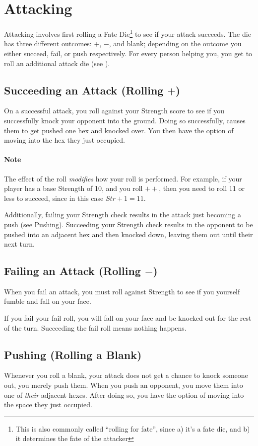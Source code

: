 \section{Attacking} \label{attacking}
Attacking involves first rolling a Fate Die\footnote{This is also commonly called ``rolling for fate'', since a) it's a fate die, and b) it determines the fate of the attacker} to see if your attack succeeds.
The die has three different outcomes: $+$, $-$, and blank; depending on the outcome you either succeed, fail, or push respectively.
For every person helping you, you get to roll an additional attack die (see ).

\subsection{Succeeding an Attack (Rolling $+$)}
On a successful attack, you roll against your Strength score to see if you successfully knock your opponent into the ground.
Doing so successfully, causes them to get pushed one hex and knocked over.
You then have the option of moving into the hex they just occupied.

\paragraph{Note} The effect of the roll \textit{modifies} how your roll is performed.
For example, if your player has a base Strength of 10, and you roll $++$, then you need to roll 11 or less to succeed, since in this case $Str+1=11$.

Additionally, failing your Strength check results in the attack just becoming a push (see Pushing).
Succeeding your Strength check results in the opponent to be pushed into an adjacent hex and then knocked down, leaving them out until their next turn.

\subsection{Failing an Attack (Rolling $-$)}
When you fail an attack, you must roll against Strength to see if you yourself fumble and fall on your face.

If you fail your fail roll, you will fall on your face and be knocked out for the rest of the turn.
Succeeding the fail roll means nothing happens.

\subsection{Pushing (Rolling a Blank)}
Whenever you roll a blank, your attack does not get a chance to knock someone out, you merely push them.
When you push an opponent, you move them into one of \textit{their} adjacent hexes.
After doing so, you have the option of moving into the space they just occupied.

